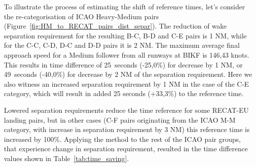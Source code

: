 To illustrate the process of estimating the shift of reference times, let's consider the re-categorisation of ICAO Heavy-Medium pairs (Figure~\ref{fig:HM_to_RECAT_pairs_dist_separ}). The reduction of wake separation requirement for the resulting B-C, B-D and C-E pairs is 1 NM, while for the C-C, C-D, D-C and D-D pairs it is 2 NM. The maximum average final approach speed for a Medium follower from all runways at BIKF is 146,43 knots. This results in time difference of 25~seconds (-25,0\%) for decrease by 1 NM, or 49~seconds (-40,0\%) for decrease by 2 NM of the separation requirement. Here we also witness an increased separation requirement by 1 NM in the case of the C-E category, which will result in added 25 seconds (+33,3\%) to the reference time.

Lowered separation requirements reduce the time reference for some RECAT-EU landing pairs, but in other cases (C-F pairs originating from the ICAO M-M category, with increase in separation requirement by 3 NM) this reference time is increased by 100\%. Applying the method to the rest of the ICAO pair groups, that experience change in separation requirement, resulted in the time difference values shown in Table~\ref{tab:time_saving}.

